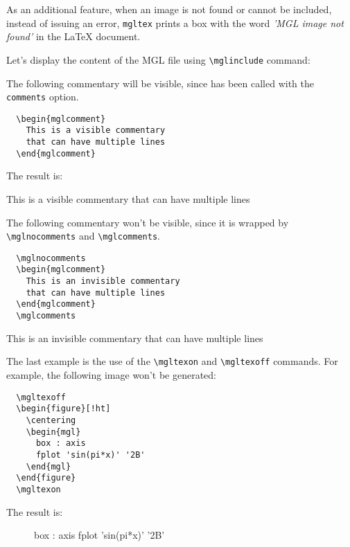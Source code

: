\documentclass{article}
\begin{document}
As an additional feature, when an image is not found or cannot be included, instead of issuing an error, \texttt{mgltex} prints a box with the word \emph{'MGL image not found'} in the LaTeX document.
\begin{figure}[!ht]
  \centering
\end{figure}

Let's display the content of the MGL file using \texttt{\textbackslash{}mglinclude} command:

The following commentary will be visible, since \mglTeX{} has been called with the \texttt{comments} option.
\begin{verbatim}
  \begin{mglcomment}
    This is a visible commentary
    that can have multiple lines
  \end{mglcomment}
\end{verbatim}
The result is:
\begin{mglcomment}
  This is a visible commentary
  that can have multiple lines
\end{mglcomment}

The following commentary won't be visible, since it is wrapped by \texttt{\textbackslash{}mglnocomments} and \texttt{\textbackslash{}mglcomments}.
\begin{verbatim}
  \mglnocomments
  \begin{mglcomment}
    This is an invisible commentary
    that can have multiple lines
  \end{mglcomment}
  \mglcomments
\end{verbatim}
\mglnocomments
\begin{mglcomment}
  This is an invisible commentary
  that can have multiple lines
\end{mglcomment}
\mglcomments

The last example is the use of the \texttt{\textbackslash{}mgltexon} and \texttt{\textbackslash{}mgltexoff} commands. For example, the following image won't be generated:
\begin{verbatim}
  \mgltexoff
  \begin{figure}[!ht]
    \centering
    \begin{mgl}
      box : axis
      fplot 'sin(pi*x)' '2B'
    \end{mgl}
  \end{figure}
  \mgltexon
\end{verbatim}
The result is:
\mgltexoff
\begin{figure}[!ht]
  \centering
  \begin{mgl}
    box : axis
    fplot 'sin(pi*x)' '2B'
  \end{mgl}
\end{figure}
\mgltexon
\end{document}

